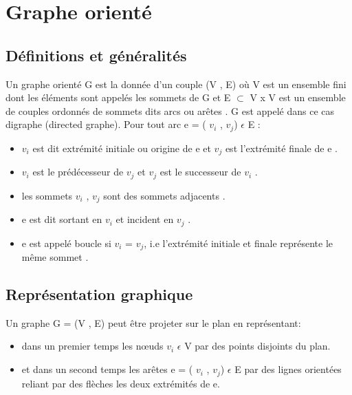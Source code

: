 \section{Graphe orienté}
		\subsection{Définitions et généralités}
		Un graphe orienté G est la donnée d'un couple (V , E) où
		V est un ensemble fini dont les éléments sont appelés les sommets de G et 
		E  $\subset$ V x V est un ensemble de couples ordonnés de sommets dits arcs ou arêtes \citep{muller}. G est appelé dans ce cas digraphe (directed graphe).
		 Pour tout arc e = ( $v_{i}$ , $v_{j}$) $\epsilon$ E :
		 \begin{itemize}  
			\item $v_{i}$ est dit extrémité initiale ou origine de e et $v_{j}$ est l'extrémité finale de e \citep{muller}.
			
			\item $v_{i}$ est le prédécesseur de $v_{j}$ et $v_{j}$ est le successeur de $v_{i}$ \citep{IUTLyonInformatique}.
			
			\item les sommets $v_{i}$ , $v_{j}$ sont des sommets adjacents \citep{Pres}.
			
			\item e est dit sortant en $v_{i}$ et incident en $v_{j}$ \citep{Pres}.
			
			\item e est appelé boucle si $v_{i}$ = $v_{j}$, i.e l'extrémité initiale et finale représente le même sommet \citep{IUTLyonInformatique}.
			
		\end{itemize}
		 
		
		\subsection{Représentation graphique}
		
		
		Un graphe G = (V , E) peut être projeter sur le plan en représentant:
		\begin{itemize} 
		\item dans un premier temps les nœuds $v_{i}$ $\epsilon$ V par des points disjoints du plan.
		\item et dans un second temps les arêtes e = ( $v_{i}$ , $v_{j}$) $\epsilon$ E par des lignes orientées reliant par des flèches les deux extrémités de e. 
		\end{itemize}
		
